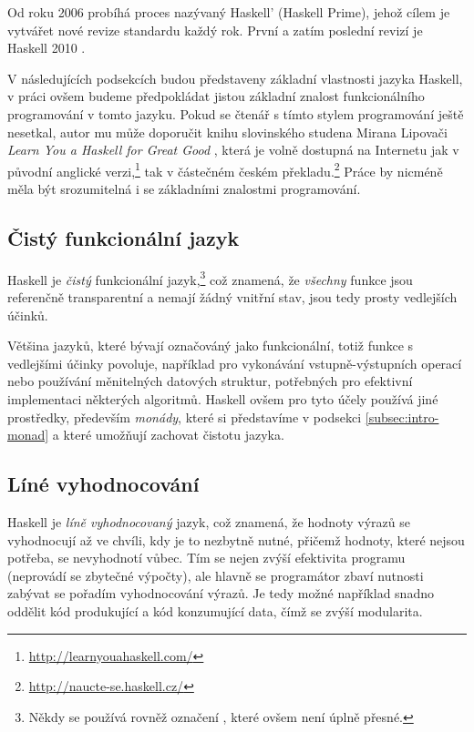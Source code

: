 Od roku 2006 probíhá proces nazývaný Haskell' (Haskell Prime), jehož cílem je
vytvářet nové revize standardu každý rok. První a zatím poslední revizí je
Haskell 2010 \cite{haskellreport2010}.

V následujících podsekcích budou představeny základní vlastnosti jazyka Haskell,
v práci ovšem budeme předpokládat jistou základní znalost funkcionálního
programování v tomto jazyku. Pokud se čtenář s tímto stylem programování ještě
nesetkal, autor mu může doporučit knihu slovinského studena Mirana Lipovači
\emph{Learn You a Haskell for Great Good} \cite{lipovaca2011learn}, která je
volně dostupná na Internetu jak v původní anglické
verzi,\footnote{\url{http://learnyouahaskell.com/}} tak v částečném českém
překladu.\footnote{\url{http://naucte-se.haskell.cz/}} Práce by nicméně měla být
srozumitelná i se základními znalostmi  programování.

\subsection{Čistý funkcionální jazyk}

Haskell je \emph{čistý} funkcionální jazyk,\footnote{Někdy se používá rovněž
označení , které ovšem není úplně přesné.} což
znamená, že \emph{všechny} funkce jsou referenčně transparentní a nemají žádný
vnitřní stav, jsou tedy prosty vedlejších účinků.  

Většina jazyků, které bývají označováný jako funkcionální, totiž funkce s
vedlejšími účinky povoluje, například pro vykonávání vstupně-výstupních operací
nebo používání měnitelných datových struktur, potřebných pro efektivní
implementaci některých algoritmů. Haskell ovšem pro tyto účely používá jiné
prostředky, především \emph{monády}, které si představíme v podsekci
\ref{subsec:intro-monad} a které umožňují zachovat čistotu jazyka.

\subsection{Líné vyhodnocování}

Haskell je \emph{líně vyhodnocovaný} jazyk, což znamená, že hodnoty výrazů se
vyhodnocují až ve chvíli, kdy je to nezbytně nutné, přičemž hodnoty, které
nejsou potřeba, se nevyhodnotí vůbec. Tím se nejen zvýší efektivita programu
(neprovádí se zbytečné výpočty), ale hlavně se programátor zbaví nutnosti
zabývat se pořadím vyhodnocování výrazů. Je tedy možné například snadno oddělit
kód produkující a kód konzumující data, čímž se zvýší modularita.
\cite{hughes1989functional}

